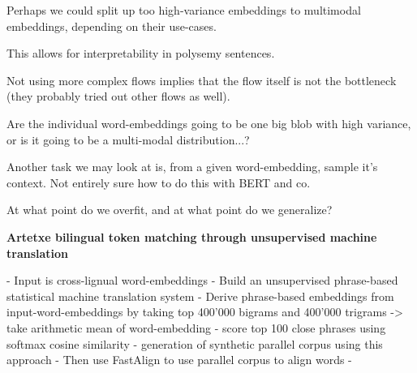 \documentclass[a4paper,12pt,twoside,openright]{report}
\begin{document}
Perhaps we could split up too high-variance embeddings to multimodal embeddings, depending on their use-cases.

This allows for interpretability in polysemy sentences.

Not using more complex flows implies that the flow itself is not the bottleneck (they probably tried out other flows as well).

Are the individual word-embeddings going to be one big blob with high variance, or is it going to be a multi-modal distribution...?

Another task we may look at is, from a given word-embedding, sample it's context. 
Not entirely sure how to do this with BERT and co.

At what point do we overfit, and at what point do we generalize?


\textbf{Artetxe bilingual token matching through unsupervised machine translation}

- Input is cross-lignual word-embeddings
- Build an unsupervised phrase-based statistical machine translation system
- Derive phrase-based embeddings from input-word-embeddings by taking top 400'000 bigrams and 400'000 trigrams -> take arithmetic mean of word-embedding
- score top 100 close phrases using softmax cosine similarity
- generation of synthetic parallel corpus using this approach
- Then use FastAlign to use parallel corpus to align words
- 
\end{document}
